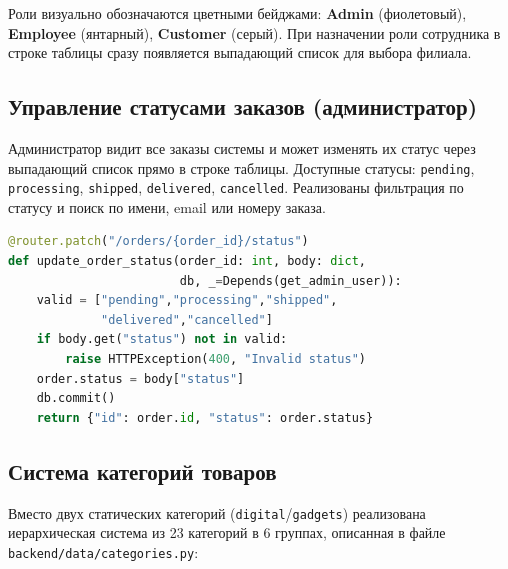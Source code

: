 \documentclass[14pt,a4paper]{extreport}
\begin{document}
Роли визуально обозначаются цветными бейджами: \textbf{Admin} (фиолетовый), \textbf{Employee} (янтарный), \textbf{Customer} (серый). При назначении роли сотрудника в строке таблицы сразу появляется выпадающий список для выбора филиала.

\subsection{Управление статусами заказов (администратор)}

Администратор видит все заказы системы и может изменять их статус через выпадающий список прямо в строке таблицы. Доступные статусы: \texttt{pending}, \texttt{processing}, \texttt{shipped}, \texttt{delivered}, \texttt{cancelled}. Реализованы фильтрация по статусу и поиск по имени, email или номеру заказа.

\begin{lstlisting}[language=Python, caption={Изменение статуса заказа администратором}]
@router.patch("/orders/{order_id}/status")
def update_order_status(order_id: int, body: dict,
                        db, _=Depends(get_admin_user)):
    valid = ["pending","processing","shipped",
             "delivered","cancelled"]
    if body.get("status") not in valid:
        raise HTTPException(400, "Invalid status")
    order.status = body["status"]
    db.commit()
    return {"id": order.id, "status": order.status}
\end{lstlisting}

\subsection{Система категорий товаров}

Вместо двух статических категорий (\texttt{digital}/\texttt{gadgets}) реализована иерархическая система из 23 категорий в 6 группах, описанная в файле \texttt{backend/data/categories.py}:

\begin{table}[h!]
\centering
\caption{Группы и примеры категорий}
\end{table}
\end{document}
